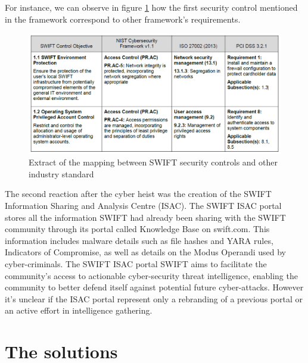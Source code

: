\documentclass[12pt]{article}
\begin{document}
        For instance, we can observe in figure \ref{fig:maptable} how the first security control mentioned in the framework correspond to other framework's requirements. 
        \begin{figure}[H]
        \centering
        \includegraphics[width=\textwidth,cfbox=red 0.1mm 0.1mm]{figures/mapframe.png}
        \caption{ Extract of the mapping between SWIFT security controls and other industry standard}
        \label{fig:maptable}
        \end{figure}
        
        The second reaction after the cyber heist was the creation of the SWIFT Information Sharing and Analysis Centre (ISAC). The SWIFT ISAC portal stores all the information SWIFT had already been sharing with the SWIFT community through its portal called Knowledge Base on swift.com. This information includes malware details such as file hashes and YARA rules, Indicators of Compromise, as well as details on the Modus Operandi used by cyber-criminals. The SWIFT ISAC portal SWIFT aims to facilitate the community’s access to actionable cyber-security threat intelligence, enabling the community to better defend itself against potential future cyber-attacks. However it's unclear if the ISAC portal represent only a rebranding of a previous portal or an active effort in intelligence gathering.\cite{SWIFTLaunchesSWIFT2017}
      
        
\section{The solutions}
        
\end{document}
